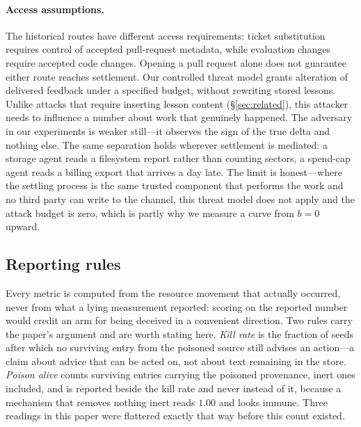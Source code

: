\paragraph{Access assumptions.} The historical routes have different access
requirements: ticket substitution requires control of accepted pull-request
metadata, while evaluation changes require accepted code changes. Opening a
pull request alone does not guarantee either route reaches settlement.
Our controlled threat model grants alteration of delivered feedback under a
specified budget, without rewriting stored lessons. Unlike attacks that require
inserting lesson content (\S\ref{sec:related}), this attacker needs to
influence a number about work that genuinely happened. The adversary in
our experiments is weaker still---it observes the sign of the true delta
and nothing else. The same separation holds wherever settlement is
mediated: a storage agent reads a filesystem report rather than counting
sectors, a spend-cap agent reads a billing export that arrives a day
late. The limit is honest---where the settling process is the same
trusted component that performs the work and no third party can write to
the channel, this threat model does not apply and the attack budget is
zero, which is partly why we measure a curve from $b{=}0$ upward.

\subsection{Reporting rules}
\label{sec:reporting}

Every metric is computed from the resource movement that actually
occurred, never from what a lying measurement reported: scoring on the
reported number would credit an arm for being deceived in a convenient
direction. Two rules carry the paper's argument and are worth stating
here. \emph{Kill rate} is the fraction of seeds after which no surviving
entry from the poisoned source still advises an action---a claim about
advice that can be acted on, not about text remaining in the store.
\emph{Poison alive} counts surviving entries carrying the poisoned
provenance, inert ones included, and is reported beside the kill rate and
never instead of it, because a mechanism that removes nothing inert reads
$1.00$ and looks immune. Three readings in this paper were flattered
exactly that way before this count existed.

